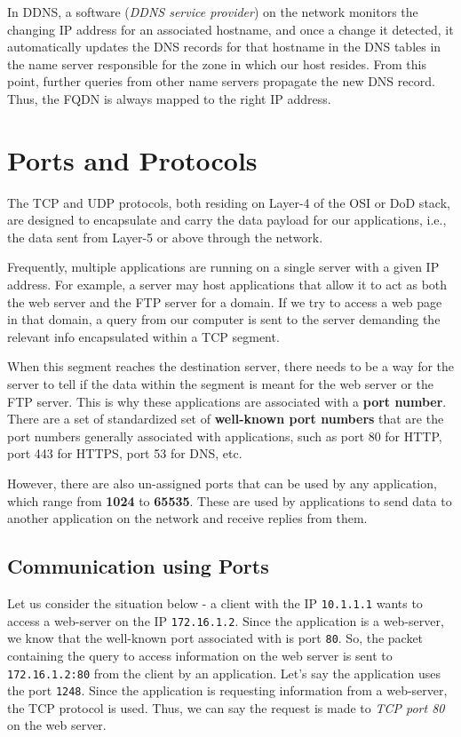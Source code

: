 In DDNS, a software (\textit{DDNS service provider}) on the network monitors the changing IP address for an associated hostname, and once a change it detected, it automatically updates the DNS records for that hostname in the DNS tables in the name server responsible for the zone in which our host resides. From this point, further queries from other name servers propagate the new DNS record. Thus, the FQDN is always mapped to the right IP address. 

\section{Ports and Protocols}
The TCP and UDP protocols, both residing on Layer-4 of the OSI or DoD stack, are designed to encapsulate and carry the data payload for our applications, i.e., the data sent from Layer-5 or above through the network. 

Frequently, multiple applications are running on a single server with a given IP address. For example, a server may host applications that allow it to act as both the web server and the FTP server for a domain. If we try to access a web page in that domain, a query from our computer is sent to the server demanding the relevant info encapsulated within a TCP segment. 

When this segment reaches the destination server, there needs to be a way for the server to tell if the data within the segment is meant for the web server or the FTP server. This is why these applications are associated with a \textbf{port number}. There are a set of standardized set of \textbf{well-known port numbers} that are the port numbers generally associated with applications, such as port 80 for HTTP, port 443 for HTTPS, port 53 for DNS, etc. 

However, there are also un-assigned ports that can be used by any application, which range from \textbf{1024} to \textbf{65535}. These are used by applications to send data to another application on the network and receive replies from them. 

\subsection{Communication using Ports}
Let us consider the situation below - a client with the IP \verb|10.1.1.1| wants to access a web-server on the IP \verb|172.16.1.2|. Since the application is a web-server, we know that the well-known port associated with is port \verb|80|. So, the packet containing the query to access information on the web server is sent to \verb|172.16.1.2:80| from the client by an application. Let's say the application uses the port \verb|1248|. Since the application is requesting information from a web-server, the TCP protocol is used. Thus, we can say the request is made to \textit{TCP port 80} on the web server. 

